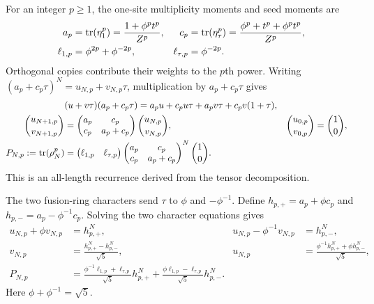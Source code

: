 \documentclass[aps,pra,reprint,nofootinbib,onecolumn]{revtex4-2}
\begin{document}
For an integer $p\geq1$, the one-site multiplicity moments and seed
moments are
\begin{align}
	a_p           & =\operatorname{tr}(\eta_1^p)=\frac{1+\phi^pt^p}{Z^p}, &
	c_p           & =\operatorname{tr}(\eta_\tau^p)
	=\frac{\phi^p+t^p+\phi^pt^p}{Z^p},
	\nonumber                                                 \\
	\ell_{1,p}    & =\phi^{2p}+\phi^{-2p},                  &
	\ell_{\tau,p} & =\phi^{-2p}.
	\label{eq:moment-data}
\end{align}
Orthogonal copies contribute their weights to the $p$th power.
Writing $(a_p+c_p\tau)^N=u_{N,p}+v_{N,p}\tau$, multiplication by
$a_p+c_p\tau$ gives
\begin{align}
	                          & (u+v\tau)(a_p+c_p\tau)
	=a_pu+c_pu\tau+a_pv\tau+c_pv(1+\tau),
	\nonumber                                                                         \\
	\binom{u_{N+1,p}}{v_{N+1,p}}
	                          & =\begin{pmatrix}a_p&c_p\\c_p&a_p+c_p\end{pmatrix}
	\binom{u_{N,p}}{v_{N,p}}, &
	\binom{u_{0,p}}{v_{0,p}}  & =\binom10,
	\nonumber                                                                         \\
	P_{N,p}:=\operatorname{tr}(\rho_N^p)
	                          & =\begin{pmatrix}\ell_{1,p}&\ell_{\tau,p}\end{pmatrix}
	\begin{pmatrix}a_p&c_p\\c_p&a_p+c_p\end{pmatrix}^{N}
	\binom10.
	\label{eq:moment-recurrence}
\end{align}
This is an all-length recurrence derived from the tensor decomposition.

The two fusion-ring characters send $\tau$ to $\phi$ and
$-\phi^{-1}$. Define $h_{p,+}=a_p+\phi c_p$ and
$h_{p,-}=a_p-\phi^{-1}c_p$. Solving the two character equations gives
\begin{align}
	u_{N,p}+\phi v_{N,p}     & =h_{p,+}^{N},                                                &
	u_{N,p}-\phi^{-1}v_{N,p} & =h_{p,-}^{N},
	\nonumber                                                                                 \\
	v_{N,p}                  & =\frac{h_{p,+}^{N}-h_{p,-}^{N}}{\sqrt5},                     &
	u_{N,p}                  & =\frac{\phi^{-1}h_{p,+}^{N}+\phi h_{p,-}^{N}}{\sqrt5},
	\nonumber                                                                                 \\
	P_{N,p}
	                         & =\frac{\phi^{-1}\ell_{1,p}+\ell_{\tau,p}}{\sqrt5}h_{p,+}^{N}
	+\frac{\phi\ell_{1,p}-\ell_{\tau,p}}{\sqrt5}h_{p,-}^{N}.
	\label{eq:moments}
\end{align}
Here $\phi+\phi^{-1}=\sqrt5$.
\end{document}
